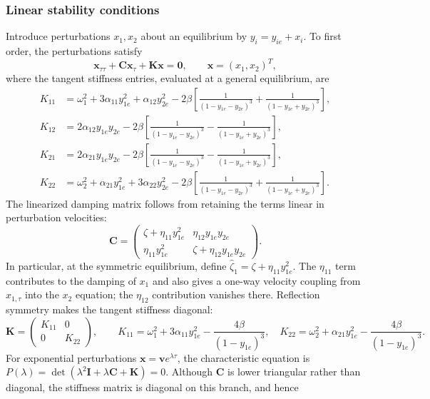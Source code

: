 \documentclass[11pt]{article}
\begin{document}
\subsubsection*{Linear stability conditions}
Introduce perturbations $x_1,x_2$ about an equilibrium by $y_i=y_{ie}+x_i$. To first order, the perturbations satisfy
\begin{equation}\label{eq:linearized-system}
\mathbf{x}_{\tau\tau}+\mathbf{C}\mathbf{x}_{\tau}+\mathbf{K}\mathbf{x}=\mathbf{0},
\qquad \mathbf{x}=(x_1,x_2)^T,
\end{equation}
where the tangent stiffness entries, evaluated at a general equilibrium, are
\begin{align*}
K_{11}&=\omega_1^2+3\alpha_{11}y_{1e}^2+\alpha_{12}y_{2e}^2
-2\beta\left[\frac{1}{(1-y_{1e}-y_{2e})^3}+\frac{1}{(1-y_{1e}+y_{2e})^3}\right],\\
K_{12}&=2\alpha_{12}y_{1e}y_{2e}
-2\beta\left[\frac{1}{(1-y_{1e}-y_{2e})^3}-\frac{1}{(1-y_{1e}+y_{2e})^3}\right],\\
K_{21}&=2\alpha_{21}y_{1e}y_{2e}
-2\beta\left[\frac{1}{(1-y_{1e}-y_{2e})^3}-\frac{1}{(1-y_{1e}+y_{2e})^3}\right],\\
K_{22}&=\omega_2^2+\alpha_{21}y_{1e}^2+3\alpha_{22}y_{2e}^2
-2\beta\left[\frac{1}{(1-y_{1e}-y_{2e})^3}+\frac{1}{(1-y_{1e}+y_{2e})^3}\right].
\end{align*}
The linearized damping matrix follows from retaining the terms linear in perturbation velocities:
\[
\mathbf{C}=\begin{pmatrix}
\zeta+\eta_{11}y_{1e}^2 & \eta_{12}y_{1e}y_{2e}\\
\eta_{11}y_{1e}^2 & \zeta+\eta_{12}y_{1e}y_{2e}
\end{pmatrix}.
\]
In particular, at the symmetric equilibrium, define $\hat{\zeta}_1=\zeta+\eta_{11}y_{1e}^2$. The $\eta_{11}$ term contributes to the damping of $x_1$ and also gives a one-way velocity coupling from $x_{1,\tau}$ into the $x_2$ equation; the $\eta_{12}$ contribution vanishes there. Reflection symmetry makes the tangent stiffness diagonal:
\begin{equation}\label{eq:symmetric-stiffness}
\mathbf{K}=\begin{pmatrix}K_{11}&0\\0&K_{22}\end{pmatrix},\qquad
K_{11}=\omega_1^2+3\alpha_{11}y_{1e}^2-\frac{4\beta}{(1-y_{1e})^3},\quad
K_{22}=\omega_2^2+\alpha_{21}y_{1e}^2-\frac{4\beta}{(1-y_{1e})^3}.
\end{equation}
For exponential perturbations $\mathbf{x}=\mathbf{v}e^{\lambda\tau}$, the characteristic equation is $P(\lambda)=\det(\lambda^2\mathbf{I}+\lambda\mathbf{C}+\mathbf{K})=0$. Although $\mathbf{C}$ is lower triangular rather than diagonal, the stiffness matrix is diagonal on this branch, and hence
\end{document}

